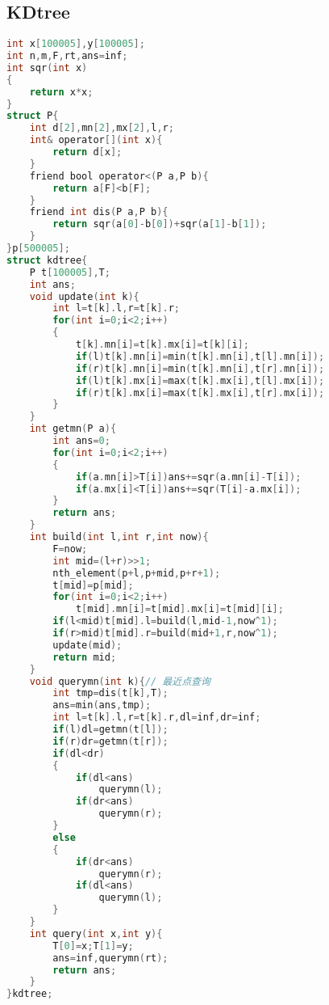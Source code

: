 \subsection{KDtree}
\begin{lstlisting}[language=C]
int x[100005],y[100005];
int n,m,F,rt,ans=inf;
int sqr(int x)
{
    return x*x;
}
struct P{
	int d[2],mn[2],mx[2],l,r;
	int& operator[](int x){
		return d[x];
	}
	friend bool operator<(P a,P b){
		return a[F]<b[F];
	}
	friend int dis(P a,P b){
		return sqr(a[0]-b[0])+sqr(a[1]-b[1]);
	}
}p[500005];
struct kdtree{
	P t[100005],T;
	int ans;
	void update(int k){
		int l=t[k].l,r=t[k].r;
		for(int i=0;i<2;i++)
		{
			t[k].mn[i]=t[k].mx[i]=t[k][i];
			if(l)t[k].mn[i]=min(t[k].mn[i],t[l].mn[i]);
			if(r)t[k].mn[i]=min(t[k].mn[i],t[r].mn[i]);
			if(l)t[k].mx[i]=max(t[k].mx[i],t[l].mx[i]);
			if(r)t[k].mx[i]=max(t[k].mx[i],t[r].mx[i]);
		}
	}
    int getmn(P a){
		int ans=0;
		for(int i=0;i<2;i++)
        {
            if(a.mn[i]>T[i])ans+=sqr(a.mn[i]-T[i]);
            if(a.mx[i]<T[i])ans+=sqr(T[i]-a.mx[i]);
        }
		return ans;
	}
	int build(int l,int r,int now){
		F=now;
		int mid=(l+r)>>1;
		nth_element(p+l,p+mid,p+r+1);
		t[mid]=p[mid];
        for(int i=0;i<2;i++)
            t[mid].mn[i]=t[mid].mx[i]=t[mid][i];
		if(l<mid)t[mid].l=build(l,mid-1,now^1);
		if(r>mid)t[mid].r=build(mid+1,r,now^1);
		update(mid);
		return mid;
	}
	void querymn(int k){// 最近点查询
		int tmp=dis(t[k],T);
		ans=min(ans,tmp);
		int l=t[k].l,r=t[k].r,dl=inf,dr=inf;
		if(l)dl=getmn(t[l]);
        if(r)dr=getmn(t[r]);
		if(dl<dr)
		{
			if(dl<ans)
                querymn(l);
			if(dr<ans)
                querymn(r);
		}
		else 
		{
			if(dr<ans)
                querymn(r);
			if(dl<ans)
                querymn(l);
		}
	}
	int query(int x,int y){
		T[0]=x;T[1]=y;
		ans=inf,querymn(rt);
		return ans;
	}
}kdtree;
\end{lstlisting}
